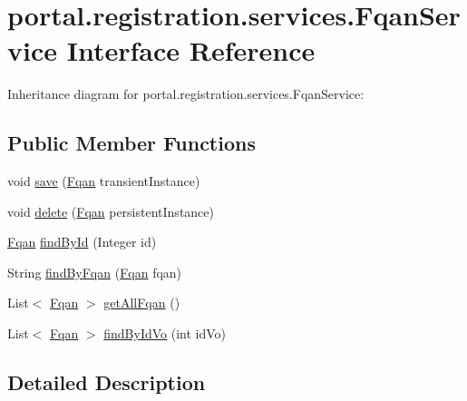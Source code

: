 \hypertarget{interfaceportal_1_1registration_1_1services_1_1FqanService}{
\section{portal.registration.services.FqanService Interface Reference}
\label{interfaceportal_1_1registration_1_1services_1_1FqanService}
}


Inheritance diagram for portal.registration.services.FqanService:
\subsection*{Public Member Functions}
\begin{DoxyCompactItemize}
\item 
void \hyperlink{interfaceportal_1_1registration_1_1services_1_1FqanService_a6822964f5c5661b9cdf75d15305ae18a}{save} (\hyperlink{classportal_1_1registration_1_1domain_1_1Fqan}{Fqan} transientInstance)
\item 
void \hyperlink{interfaceportal_1_1registration_1_1services_1_1FqanService_a849fc3641487314786688c18f557c200}{delete} (\hyperlink{classportal_1_1registration_1_1domain_1_1Fqan}{Fqan} persistentInstance)
\item 
\hyperlink{classportal_1_1registration_1_1domain_1_1Fqan}{Fqan} \hyperlink{interfaceportal_1_1registration_1_1services_1_1FqanService_a269c9faedfbb13d6ecaa783554b61ea6}{findById} (Integer id)
\item 
String \hyperlink{interfaceportal_1_1registration_1_1services_1_1FqanService_a1564bbe8c7c83582432ca37840265cdb}{findByFqan} (\hyperlink{classportal_1_1registration_1_1domain_1_1Fqan}{Fqan} fqan)
\item 
List$<$ \hyperlink{classportal_1_1registration_1_1domain_1_1Fqan}{Fqan} $>$ \hyperlink{interfaceportal_1_1registration_1_1services_1_1FqanService_abf80debc909bda6634a7ca2a0c046643}{getAllFqan} ()
\item 
List$<$ \hyperlink{classportal_1_1registration_1_1domain_1_1Fqan}{Fqan} $>$ \hyperlink{interfaceportal_1_1registration_1_1services_1_1FqanService_aca0e7fff1b64885dc7d1454fa9451d04}{findByIdVo} (int idVo)
\end{DoxyCompactItemize}


\subsection{Detailed Description}


